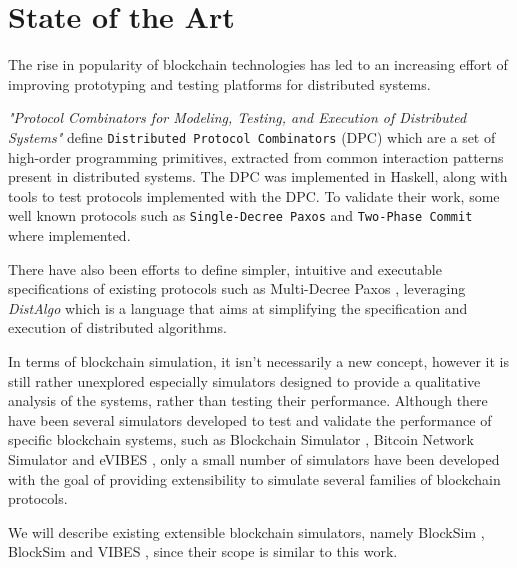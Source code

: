 

\chapter{State of the Art}
\label{cha:state-of-the-art}

The rise in popularity of blockchain technologies has led to an increasing effort of improving prototyping and testing platforms for distributed systems.

\textit{"Protocol Combinators for Modeling, Testing, and Execution of Distributed Systems"} \cite{combinators_dist_systems} define \texttt{Distributed Protocol Combinators} (DPC) which are a set of high-order programming primitives, extracted from common interaction patterns present in distributed systems. The DPC was implemented in Haskell, along with tools to test protocols implemented with the DPC. To validate their work, some well known protocols such as \texttt{Single-Decree Paxos} and \texttt{Two-Phase Commit} where implemented.

There have also been efforts to define simpler, intuitive and executable specifications of existing protocols such as Multi-Decree Paxos \cite{paxos_highlevel_spec}, leveraging \textit{DistAlgo} \cite{distalgo} which is a language that aims at simplifying the specification and execution of distributed algorithms.

In terms of blockchain simulation, it isn’t necessarily a new concept, however it is still rather unexplored especially simulators designed to provide a qualitative analysis of the systems, rather than testing their performance. Although there have been several simulators developed to test and validate the performance of specific blockchain systems, such as Blockchain Simulator \cite{sec_pow_blockchains}, Bitcoin Network Simulator \cite{local_bitcoin_netsim} and eVIBES \cite{evibes}, only a small number of simulators have been developed with the goal of providing extensibility to simulate several families of blockchain protocols.

We will describe existing extensible blockchain simulators, namely BlockSim \cite{blocksim1}, BlockSim \cite{blocksim2} and VIBES \cite{vibes}, since their scope is similar to this work.


